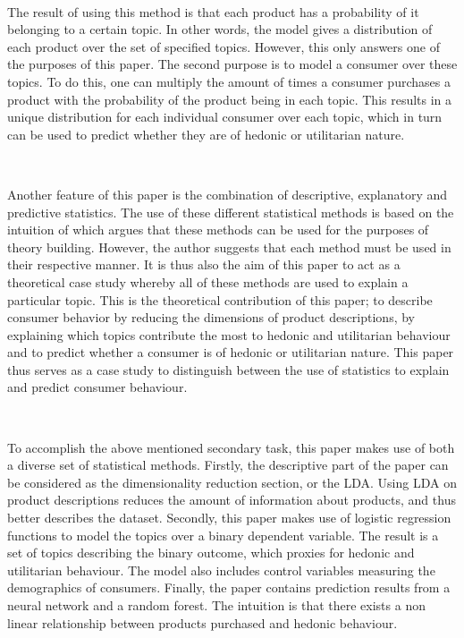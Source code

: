 \

The result of using this method is that each product has a probability of it belonging to a certain topic. In other words, the model gives a distribution of each product over the set of specified topics. However, this only answers one of the purposes of this paper. The second purpose is to model a consumer over these topics. To do this, one can multiply the amount of times a consumer purchases a product with the probability of the product being in each topic. This results in a unique distribution for each individual consumer over each topic, which in turn can be used to predict whether they are of hedonic or utilitarian nature.

\

Another feature of this paper is the combination of descriptive, explanatory and predictive statistics. The use of these different statistical methods is based on the intuition of \cite{shmueli2010explain} which argues that these methods can be used for the purposes of theory building. However, the author suggests that each method must be used in their respective manner. It is thus also the aim of this paper to act as a theoretical case study whereby all of these methods are used to explain a particular topic. This is the theoretical contribution of this paper; to describe consumer behavior by reducing the dimensions of product descriptions, by explaining which topics contribute the most to hedonic and utilitarian behaviour and to predict whether a consumer is of hedonic or utilitarian nature. This paper thus serves as a case study to distinguish between the use of statistics to explain and predict consumer behaviour. 

\

To accomplish the above mentioned secondary task, this paper makes use of both a diverse set of statistical methods. Firstly, the descriptive part of the paper can be considered as the dimensionality reduction section, or the LDA. Using LDA on product descriptions reduces the amount of information about products, and thus better describes the dataset. Secondly, this paper makes use of logistic regression functions to model the topics over a binary dependent variable. The result is a set of topics describing the binary outcome, which proxies for hedonic and utilitarian behaviour. The model also includes control variables measuring the demographics of consumers. Finally, the paper contains prediction results from a neural network and a random forest. The intuition is that there exists a non linear relationship between products purchased and hedonic behaviour. 

